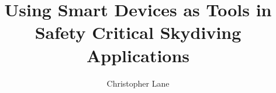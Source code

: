 \title{Using Smart Devices as Tools in Safety Critical Skydiving Applications}
\author{Christopher Lane}

\maketitle
